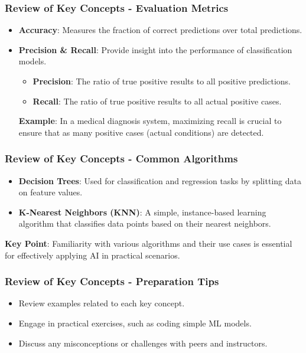 \documentclass[aspectratio=169]{beamer}
\begin{document}
\begin{frame}[fragile]
    \frametitle{Review of Key Concepts - Evaluation Metrics}
    \begin{itemize}
        \item \textbf{Accuracy}: Measures the fraction of correct predictions over total predictions.
        
        \item \textbf{Precision \& Recall}: Provide insight into the performance of classification models.
            \begin{itemize}
                \item \textbf{Precision}: The ratio of true positive results to all positive predictions.
                \item \textbf{Recall}: The ratio of true positive results to all actual positive cases.
            \end{itemize}
            \textbf{Example}: In a medical diagnosis system, maximizing recall is crucial to ensure that as many positive cases (actual conditions) are detected.
    \end{itemize}
\end{frame}

\begin{frame}[fragile]
    \frametitle{Review of Key Concepts - Common Algorithms}
    \begin{itemize}
        \item \textbf{Decision Trees}: Used for classification and regression tasks by splitting data on feature values.
        
        \item \textbf{K-Nearest Neighbors (KNN)}: A simple, instance-based learning algorithm that classifies data points based on their nearest neighbors.
    \end{itemize}
    \textbf{Key Point}: Familiarity with various algorithms and their use cases is essential for effectively applying AI in practical scenarios.
\end{frame}

\begin{frame}[fragile]
    \frametitle{Review of Key Concepts - Preparation Tips}
    \begin{itemize}
        \item Review examples related to each key concept.
        \item Engage in practical exercises, such as coding simple ML models.
        \item Discuss any misconceptions or challenges with peers and instructors.
    \end{itemize}
\end{frame}
\end{document}
